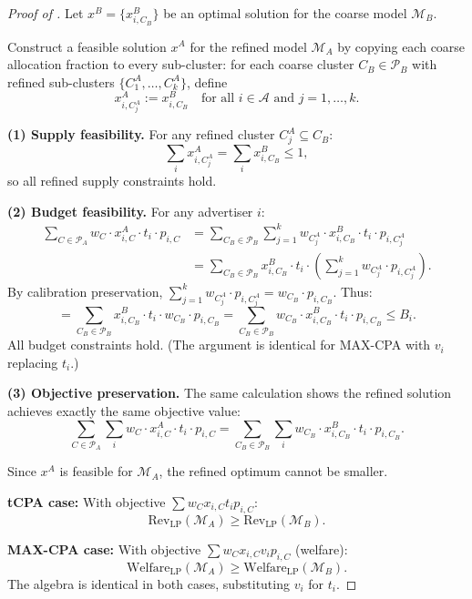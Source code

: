 \documentclass{article}
\theoremstyle{plain}
\theoremstyle{definition}
\theoremstyle{remark}
\newcommand{\cA}{\mathcal{A}}
\newcommand{\cM}{\mathcal{M}}
\newcommand{\cP}{\mathcal{P}}
\begin{document}
\begin{proof}[Proof of ]
Let $x^B = \{x^B_{i,C_B}\}$ be an optimal solution for the coarse model $\cM_B$.

Construct a feasible solution $x^A$ for the refined model $\cM_A$ by copying each coarse allocation fraction to every sub-cluster: for each coarse cluster $C_B \in \cP_B$ with refined sub-clusters $\{C^A_1, \ldots, C^A_k\}$, define
\begin{equation}
x^A_{i,C^A_j} := x^B_{i,C_B} \quad \text{for all } i \in \cA \text{ and } j = 1, \ldots, k.
\end{equation}

\textbf{(1) Supply feasibility.} For any refined cluster $C^A_j \subseteq C_B$:
\begin{equation}
\sum_i x^A_{i,C^A_j} = \sum_i x^B_{i,C_B} \leq 1,
\end{equation}
so all refined supply constraints hold.

\textbf{(2) Budget feasibility.} For any advertiser $i$:
\begin{align}
\sum_{C \in \cP_A} w_C \cdot x^A_{i,C} \cdot t_i \cdot p_{i,C}
&= \sum_{C_B \in \cP_B} \sum_{j=1}^k w_{C^A_j} \cdot x^B_{i,C_B} \cdot t_i \cdot p_{i,C^A_j} \\
&= \sum_{C_B \in \cP_B} x^B_{i,C_B} \cdot t_i \cdot \left( \sum_{j=1}^k w_{C^A_j} \cdot p_{i,C^A_j} \right).
\end{align}
By calibration preservation, $\sum_{j=1}^k w_{C^A_j} \cdot p_{i,C^A_j} = w_{C_B} \cdot p_{i,C_B}$. Thus:
\begin{equation}
= \sum_{C_B \in \cP_B} x^B_{i,C_B} \cdot t_i \cdot w_{C_B} \cdot p_{i,C_B} = \sum_{C_B \in \cP_B} w_{C_B} \cdot x^B_{i,C_B} \cdot t_i \cdot p_{i,C_B} \leq B_i.
\end{equation}
All budget constraints hold. (The argument is identical for MAX-CPA with $v_i$ replacing $t_i$.)

\textbf{(3) Objective preservation.} The same calculation shows the refined solution achieves exactly the same objective value:
\begin{equation}
\sum_{C \in \cP_A} \sum_i w_C \cdot x^A_{i,C} \cdot t_i \cdot p_{i,C} = \sum_{C_B \in \cP_B} \sum_i w_{C_B} \cdot x^B_{i,C_B} \cdot t_i \cdot p_{i,C_B}.
\end{equation}

Since $x^A$ is feasible for $\cM_A$, the refined optimum cannot be smaller.

\textbf{tCPA case:} With objective $\sum w_C x_{i,C} t_i p_{i,C}$:
\begin{equation}
\text{Rev}_{\text{LP}}(\cM_A) \geq \text{Rev}_{\text{LP}}(\cM_B).
\end{equation}

\textbf{MAX-CPA case:} With objective $\sum w_C x_{i,C} v_i p_{i,C}$ (welfare):
\begin{equation}
\text{Welfare}_{\text{LP}}(\cM_A) \geq \text{Welfare}_{\text{LP}}(\cM_B).
\end{equation}
The algebra is identical in both cases, substituting $v_i$ for $t_i$.
\end{proof}
\end{document}
